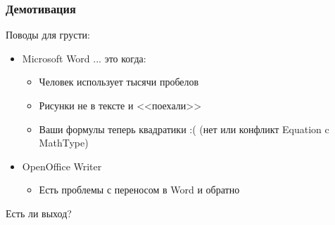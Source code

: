 \begin{frame}
	\frametitle{Демотивация}
	\pause
	
	Поводы для грусти:
    
    \pause    
    
	\begin{itemize}
	  
	  \item Microsoft Word \pause ... это когда:
	  \pause
	  \begin{itemize}
		  \item Человек использует тысячи пробелов
		  \pause
		  \item Рисунки не в тексте \pause и <<поехали>>
		  \pause
		  \item Ваши формулы теперь квадратики \pause :( \pause (нет или конфликт Equation c MathType)
	  \end{itemize}
	  \pause
	  \item OpenOffice Writer
	  \begin{itemize}
	  	\pause
	  	\item Есть проблемы с переносом в Word и обратно
	  \end{itemize}	  
	\end{itemize}

	\pause
	Есть ли выход?
	
\end{frame}
